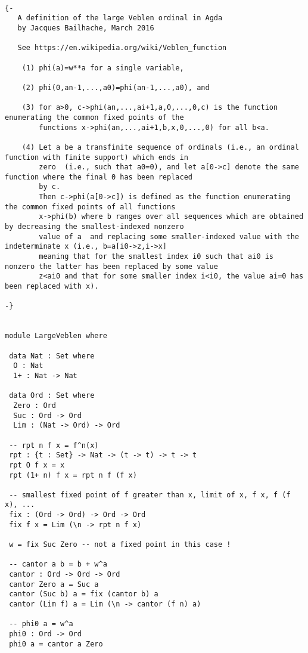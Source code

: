 \documentclass[10pt]{article}
\begin{document}
\begin{verbatim}

{- 
   A definition of the large Veblen ordinal in Agda
   by Jacques Bailhache, March 2016

   See https://en.wikipedia.org/wiki/Veblen_function

    (1) phi(a)=w**a for a single variable,

    (2) phi(0,an-1,...,a0)=phi(an-1,...,a0), and

    (3) for a>0, c->phi(an,...,ai+1,a,0,...,0,c) is the function enumerating the common fixed points of the
        functions x->phi(an,...,ai+1,b,x,0,...,0) for all b<a.

    (4) Let a be a transfinite sequence of ordinals (i.e., an ordinal function with finite support) which ends in 
        zero  (i.e., such that a0=0), and let a[0->c] denote the same function where the final 0 has been replaced 
        by c. 
        Then c->phi(a[0->c]) is defined as the function enumerating the common fixed points of all functions 
        x->phi(b) where b ranges over all sequences which are obtained by decreasing the smallest-indexed nonzero 
        value of a  and replacing some smaller-indexed value with the indeterminate x (i.e., b=a[i0->z,i->x] 
        meaning that for the smallest index i0 such that ai0 is nonzero the latter has been replaced by some value 
        z<ai0 and that for some smaller index i<i0, the value ai=0 has been replaced with x).

-}


module LargeVeblen where

 data Nat : Set where
  O : Nat
  1+ : Nat -> Nat

 data Ord : Set where
  Zero : Ord
  Suc : Ord -> Ord
  Lim : (Nat -> Ord) -> Ord

 -- rpt n f x = f^n(x)
 rpt : {t : Set} -> Nat -> (t -> t) -> t -> t
 rpt O f x = x
 rpt (1+ n) f x = rpt n f (f x)

 -- smallest fixed point of f greater than x, limit of x, f x, f (f x), ...
 fix : (Ord -> Ord) -> Ord -> Ord
 fix f x = Lim (\n -> rpt n f x)

 w = fix Suc Zero -- not a fixed point in this case !

 -- cantor a b = b + w^a
 cantor : Ord -> Ord -> Ord
 cantor Zero a = Suc a
 cantor (Suc b) a = fix (cantor b) a
 cantor (Lim f) a = Lim (\n -> cantor (f n) a)

 -- phi0 a = w^a
 phi0 : Ord -> Ord
 phi0 a = cantor a Zero


\end{verbatim}
\end{document}
